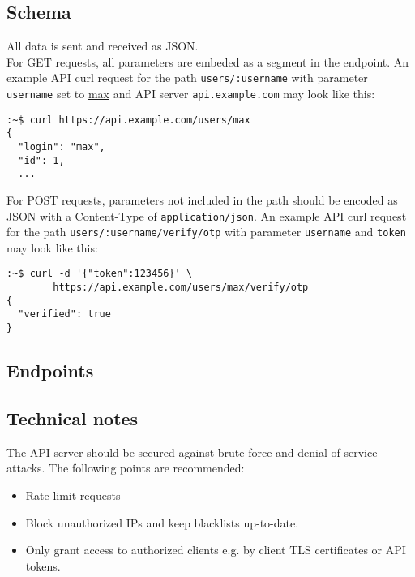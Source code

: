 \subsection{Schema}

All data is sent and received as JSON. \\

For GET requests, all parameters are embeded as a segment in the endpoint. An
example API curl request for the path \verb+users/:username+ with parameter
\verb+username+ set to \underline{max} and API server \verb+api.example.com+
may look like this:

\begin{lstlisting}[language=none, numbers=none]
:~$ curl https://api.example.com/users/max
{
  "login": "max",
  "id": 1,
  ...
\end{lstlisting}

For POST requests, parameters not included in the path should be encoded as JSON
with a Content-Type of \verb+application/json+. An example API curl request for
the path \verb+users/:username/verify/otp+ with parameter \verb+username+ and
\verb+token+ may look like this:

\begin{lstlisting}[language=none, numbers=none]
:~$ curl -d '{"token":123456}' \
        https://api.example.com/users/max/verify/otp
{
  "verified": true
}
\end{lstlisting}


\subsection{Endpoints}

\newcommand{\includeApiDefinition}[1]{
	\begin{minipage}{\textwidth}
	
	\end{minipage}
}


\includeApiDefinition{login_credentials}
\includeApiDefinition{ssh_keys}
\includeApiDefinition{ssh_keys_notify}
\includeApiDefinition{verify_otp}


\subsection{Technical notes}

The API server should be secured against brute-force and denial-of-service
attacks. The following points are recommended:

\begin{itemize}
	\item Rate-limit requests
	\item Block unauthorized IPs and keep blacklists up-to-date.
	\item Only grant access to authorized clients e.g. by client TLS
		certificates or API tokens.
\end{itemize}
